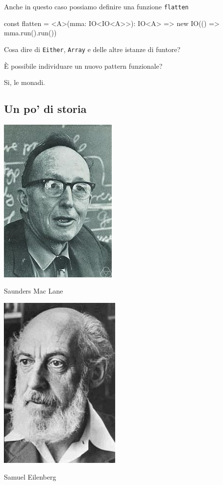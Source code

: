 \documentclass[12pt]{article}
\theoremstyle{definition}
\newenvironment{code}
  {\vspace{0.5cm} \VerbatimEnvironment\begin{typescriptcode}}
  {\end{typescriptcode} \vspace{0.2cm}}
\begin{document}
Anche in questo caso possiamo definire una funzione \texttt{flatten}

\begin{code}
const flatten = <A>(mma: IO<IO<A>>): IO<A> =>
  new IO(() => mma.run().run())
\end{code}

Cosa dire di \texttt{Either}, \texttt{Array} e delle altre istanze di funtore?

È possibile individuare un nuovo pattern funzionale?

Si, le monadi.

\subsection{Un po' di storia}

\begin{center}
\includegraphics[scale=0.6]{maclane}

Saunders Mac Lane
\end{center}

\begin{center}
\includegraphics[scale=0.6]{eilenberg}

Samuel Eilenberg
\end{center}
\end{document}
